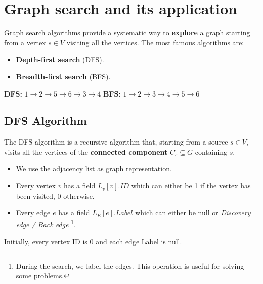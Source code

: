 \section{Graph search and its application}
Graph search algorithms provide a systematic way to \textbf{explore} a graph starting from a vertex $s \in V$ visiting all the vertices.\newline\newline
The most famous algorithms are:
\begin{itemize}
    \item \textbf{Depth-first search} (DFS).
    \item \textbf{Breadth-first search} (BFS).
\end{itemize}
\newline\newline
\textbf{DFS:} $1 \rightarrow 2 \rightarrow 5 \rightarrow 6 \rightarrow 3 \rightarrow 4$\newline
\textbf{BFS:} $1 \rightarrow 2 \rightarrow 3 \rightarrow 4 \rightarrow 5 \rightarrow 6$

\subsection{DFS Algorithm}
The DFS algorithm is a recursive algorithm that, starting from a source $s \in V$, visits all the vertices of the \textbf{connected component} $C_{s} \subseteq G$ containing $s$.
\begin{itemize}
    \item We use the adjacency list as graph representation.
    \item Every vertex $v$ has a field $L_{v}[v].ID$ which can either be 1 if the vertex has been visited, 0 otherwise.
    \item Every edge $e$ has a field $L_{E}[e].Label$ which can either be null or \textit{Discovery edge / Back edge} \footnote{During the search, we label the edges. This operation is useful for solving some problems.}.
\end{itemize}
Initially, every vertex ID is 0 and each edge Label is null.

